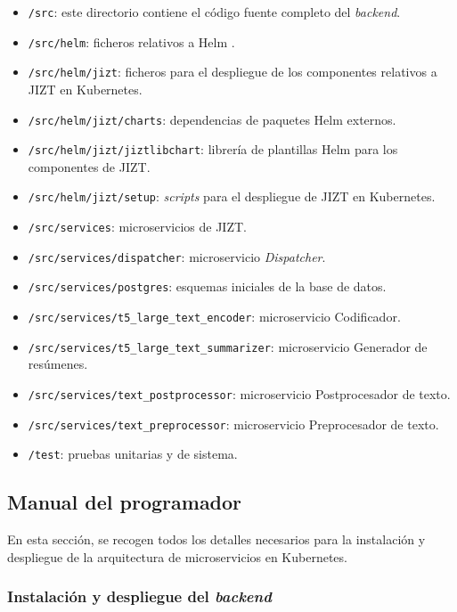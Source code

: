 \vspace{-0.2cm}
\begin{itemize} [\textbullet]
	\tightlist
	\item \texttt{/src}: este directorio contiene el código fuente completo del \emph{backend}.
	\item \texttt{/src/helm}: ficheros relativos a Helm \cite{helm}.
	\item \texttt{/src/helm/jizt}: ficheros para el despliegue de los componentes relativos a JIZT en Kubernetes.
	\item \texttt{/src/helm/jizt/charts}: dependencias de paquetes Helm externos.
	\item \texttt{/src/helm/jizt/jiztlibchart}: librería de plantillas Helm para los componentes de JIZT.
	\item \texttt{/src/helm/jizt/setup}: \emph{scripts} para el despliegue de JIZT en Kubernetes.
	\item \texttt{/src/services}: microservicios de JIZT.
	\item \texttt{/src/services/dispatcher}: microservicio \emph{Dispatcher}.
	\item \texttt{/src/services/postgres}: esquemas iniciales de la base de datos.
	\item \texttt{/src/services/t5\_large\_text\_encoder}: microservicio Codificador.
	\item \texttt{/src/services/t5\_large\_text\_summarizer}: microservicio Generador de resúmenes.
	\item \texttt{/src/services/text\_postprocessor}: microservicio Postprocesador de texto.
	\item \texttt{/src/services/text\_preprocessor}: microservicio Preprocesador de texto.
	\item \texttt{/test}: pruebas unitarias y de sistema.
\end{itemize}

\subsection{Manual del programador}

En esta sección, se recogen todos los detalles necesarios para la instalación y despliegue de la arquitectura de microservicios en Kubernetes.

\subsubsection{Instalación y despliegue del \emph{backend}}

